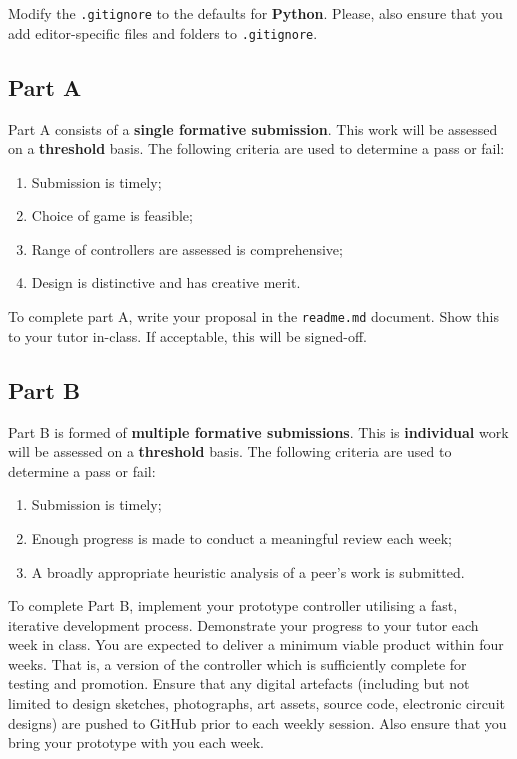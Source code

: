\documentclass{../fal_assignment}
\begin{document}
Modify the \texttt{.gitignore} to the defaults for \textbf{Python}. Please, also ensure that you add editor-specific files and folders to \texttt{.gitignore}. 

\subsection*{Part A}

Part A consists of a \textbf{single formative submission}. This work will be assessed on a \textbf{threshold} basis. The following criteria are used to determine a pass or fail:

\begin{enumerate}[label=(\alph*)]
	\item Submission is timely;
	\item Choice of game is feasible;
	\item Range of controllers are assessed is comprehensive;
	\item Design is distinctive and has creative merit.
\end{enumerate}

To complete part A, write your proposal in the \texttt{readme.md} document. Show this to your tutor in-class. If acceptable, this will be signed-off.

\subsection*{Part B}

Part B is formed of \textbf{multiple formative submissions}. This is \textbf{individual} work will be assessed on a \textbf{threshold} basis. The following criteria are used to determine a pass or fail:

\begin{enumerate}[label=(\alph*)]
	\item Submission is timely;
	\item Enough progress is made to conduct a meaningful review each week;
	\item A broadly appropriate heuristic analysis of a peer's work is submitted.
\end{enumerate}

To complete Part B, implement your prototype controller utilising a fast, iterative development process. Demonstrate your progress to your tutor each week in class. You are expected to deliver a minimum viable product within four weeks. That is, a version of the controller which is sufficiently complete for testing and promotion. Ensure that any digital artefacts (including but not limited to design sketches, photographs, art assets, source code, electronic circuit designs) are pushed to GitHub prior to each weekly session. Also ensure that you bring your prototype with you each week. 
\end{document}
